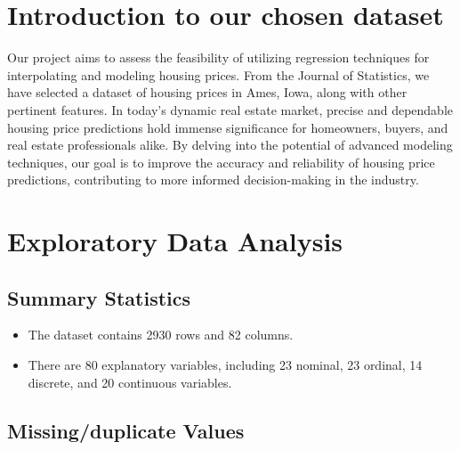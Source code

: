 \documentclass[aoas]{imsart}
\providecommand{\tightlist}{%
  \setlength{\itemsep}{0pt}\setlength{\parskip}{0pt}}
\numberwithin{equation}{section}
\theoremstyle{plain}
\theoremstyle{remark}
\begin{document}
\newenvironment{kframe}{}{}

\hypertarget{introduction-to-our-chosen-dataset}{%
\section{Introduction to our chosen
dataset}\label{introduction-to-our-chosen-dataset}}

\hfill\break

Our project aims to assess the feasibility of utilizing
regression techniques for interpolating and modeling housing prices. From the Journal of Statistics, we have selected a dataset of housing prices in Ames, Iowa, along with
other pertinent features. In today's dynamic real estate market, precise
and dependable housing price predictions hold immense significance for
homeowners, buyers, and real estate professionals alike. By delving into
the potential of advanced modeling techniques, our goal is to
improve the accuracy and reliability of housing price predictions,
contributing to more informed decision-making in the industry.

\hypertarget{exploratory-data-analysis}{%
\section{Exploratory Data Analysis}\label{exploratory-data-analysis}}

\hypertarget{summary-statistics}{%
\subsection{Summary Statistics}\label{summary-statistics}}

\begin{itemize}
\tightlist
\item
  The dataset contains 2930 rows and 82 columns.
\item
  There are 80 explanatory variables, including 23 nominal, 23 ordinal,
  14 discrete, and 20 continuous variables.
\end{itemize}

\hypertarget{missingduplicate-values}{%
\subsection{Missing/duplicate Values}\label{missingduplicate-values}}
\end{document}
